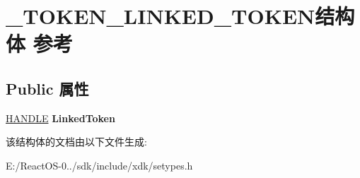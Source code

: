 \hypertarget{struct___t_o_k_e_n___l_i_n_k_e_d___t_o_k_e_n}{}\section{\+\_\+\+T\+O\+K\+E\+N\+\_\+\+L\+I\+N\+K\+E\+D\+\_\+\+T\+O\+K\+E\+N结构体 参考}
\label{struct___t_o_k_e_n___l_i_n_k_e_d___t_o_k_e_n}
\subsection*{Public 属性}
\begin{DoxyCompactItemize}
\item 
\mbox{\label{struct___t_o_k_e_n___l_i_n_k_e_d___t_o_k_e_n_af34092aa0a2ecd106cb5c7fc4d5e2f0d}} 
\hyperlink{interfacevoid}{H\+A\+N\+D\+LE} {\bfseries Linked\+Token}
\end{DoxyCompactItemize}


该结构体的文档由以下文件生成\+:\begin{DoxyCompactItemize}
\item 
E\+:/\+React\+O\+S-\/0../sdk/include/xdk/setypes.\+h\end{DoxyCompactItemize}
